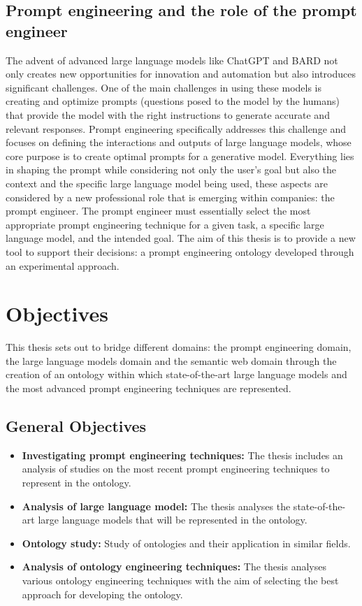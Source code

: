 \subsection{Prompt engineering and the role of the prompt engineer}
The advent of advanced large language models like ChatGPT and BARD not only creates new opportunities for innovation and automation but also introduces significant challenges. One of the main challenges in using these models is creating and optimize prompts (questions posed to the model by the humans) \cite{ref5} that provide the model with the right instructions to generate accurate and relevant responses. Prompt engineering specifically addresses this challenge and focuses on defining the interactions and outputs of large language models, whose core purpose is to create optimal prompts for a generative model.\cite{amatriain2024prompt}
Everything lies in shaping the prompt while considering not only the user’s goal but also the context and the specific large language model being used, these aspects are considered by a new professional role that is emerging within companies: the prompt engineer. The prompt engineer must essentially select the most appropriate prompt engineering technique for a given task, a specific large language model, and the intended goal. The aim of this thesis is to provide a new tool to support their decisions: a prompt engineering ontology developed through an experimental approach.
\section{Objectives}
This thesis sets out to bridge different domains: the prompt engineering domain, the large language models domain and the semantic web domain through the creation of an ontology within which state-of-the-art large language models and the most advanced prompt engineering techniques are represented.

\subsection{General Objectives}
\begin{itemize}
    \item \textbf{Investigating prompt engineering techniques:} The thesis includes an analysis of studies on the most recent prompt engineering techniques to represent in the ontology.

    \item \textbf{Analysis of large language model:} The thesis analyses the state-of-the-art large language models that will be represented in the ontology.

    \item \textbf{Ontology study:} Study of ontologies and their application in similar fields.

    \item \textbf{Analysis of ontology engineering techniques:} The thesis analyses various ontology engineering techniques with the aim of selecting the best approach for developing the ontology.
    
\end{itemize}


